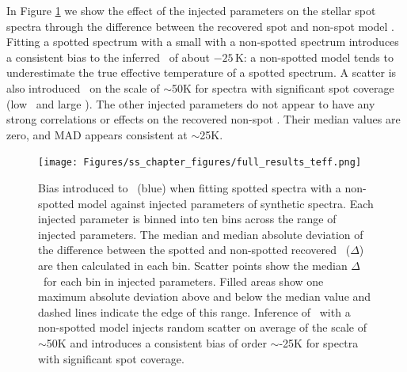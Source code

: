 In Figure \ref{fig:res_teff} we show the effect of the injected parameters on the stellar spot spectra through the difference between the recovered spot and non-spot model \teff. Fitting a spotted spectrum with a small \xspot with a non-spotted spectrum introduces a consistent bias to the inferred \teff\ of about $-25$\,K: a non-spotted model tends to underestimate the true effective temperature of a spotted spectrum. A scatter is also introduced \teff\ on the scale of $\sim$50K for spectra with significant spot coverage (low \xspot\ and large \fspot). The other injected parameters do not appear to have any strong correlations or effects on the recovered non-spot \teff. Their median values are zero, and MAD appears consistent at $\sim$25K.



\begin{figure}
    \texttt{[image: Figures/ss\_chapter\_figures/full\_results\_teff.png]}
    \caption[Bias introduced to \teff\ when fitting spotted spectra with a non-spotted model against injected parameters of synthetic spectra.]{Bias introduced to \teff\ (blue) when fitting spotted spectra with a non-spotted model against injected parameters of synthetic spectra. Each injected parameter is binned into ten bins across the range of injected parameters. The median and median absolute deviation of the difference between the spotted and non-spotted recovered \teff\ ($\Delta$\teff) are then calculated in each bin.
    Scatter points show the median $\Delta$\teff\ for each bin in injected parameters. Filled areas show one maximum absolute deviation above and below the median value and dashed lines indicate the edge of this range.
     Inference of \teff\ with a non-spotted model injects random scatter on average of the scale of $\sim$50K and introduces a consistent bias of order $\sim$-25K for spectra with significant spot coverage.
    }
    \label{fig:res_teff}
\end{figure}

